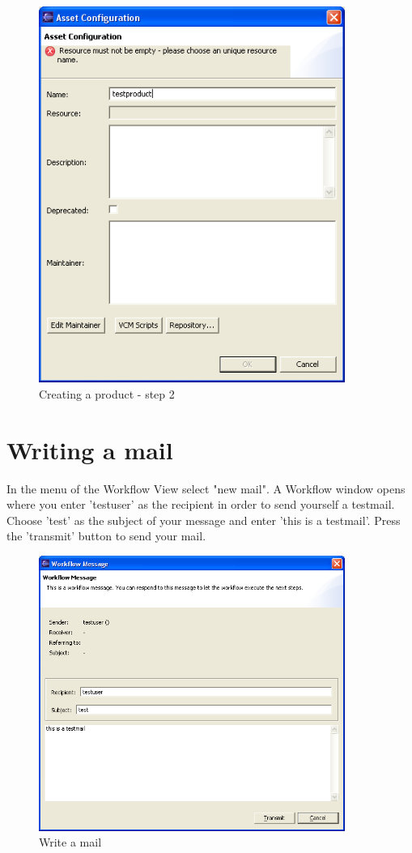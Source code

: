 \begin{figure}[h!]
\begin{center}
\includegraphics[width=10cm]{tutorial15.png}
   \caption{Creating a product - step 2}
\end{center}
\end{figure}\par





\section{Writing a mail}

In the menu of the Workflow View select "new mail". A Workflow window opens where
you enter 'testuser' as the recipient in order to send yourself a testmail. 
Choose 'test' as the subject of your message and enter 'this is a testmail'. 
Press the 'transmit' button to send your mail.

\begin{figure}[h!]
\begin{center}
\includegraphics[width=10cm]{tutorial16.png}
   \caption{Write a mail}
\end{center}
\end{figure}\par

